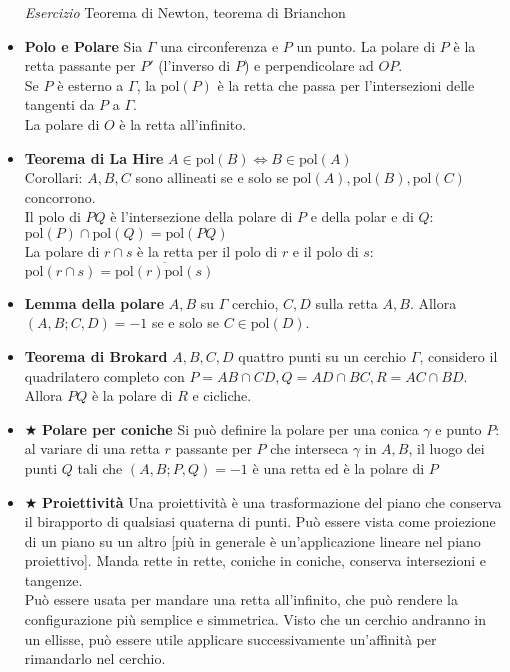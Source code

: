 \begin{itemize}
\emph{Esercizio} Teorema di Newton, teorema di Brianchon

\item \textbf{Polo e Polare}
Sia $\Gamma$ una circonferenza e $P$ un punto. La polare di $P$ è la retta passante per $P'$ (l'inverso di $P$) e perpendicolare ad $OP$. \\
Se $P$ è esterno a $\Gamma$, la $\text{pol}(P)$ è la retta che passa per l'intersezioni delle tangenti da $P$ a $\Gamma$. \\
La polare di $O$ è la retta all'infinito.

\item\textbf{Teorema di La Hire} $A \in \text{pol}(B) \iff B \in \text{pol}(A)$\\
Corollari: $A,B,C$ sono allineati se e solo se $\text{pol}(A), \text{pol}(B), \text{pol}(C)$ concorrono.\\
Il polo di $PQ$ è l'intersezione della polare di $P$ e della polar e di $Q$: $\text{pol}(P)\cap \text{pol}(Q)= \text{pol}(PQ)$\\
La polare di $r\cap s$ è la retta per il polo di $r$ e il polo di $s$:  $\text{pol}(r\cap s)= \overline{\text{pol}(r)\text{pol}(s)}$\\

\item \textbf{Lemma della polare}
$A,B$ su $\Gamma$ cerchio, $C,D$ sulla retta $A,B$. Allora $(A,B;C,D)=-1$ se e solo se $C \in \text{pol}(D)$.

\item \textbf{Teorema di Brokard}
$A,B,C,D$ quattro punti su un cerchio $\Gamma$, considero il quadrilatero completo con $P=AB\cap CD, Q=AD\cap BC, R=AC\cap BD$. Allora $PQ$ è la polare di $R$ e cicliche.

\item $\bigstar$ \textbf{Polare per coniche} 
Si può definire la polare per una conica $\gamma$ e punto $P$: al variare di una retta $r$ passante per $P$ che interseca $\gamma$ in $A,B$, il luogo dei punti $Q$ tali che $(A,B;P,Q)=-1$ è una retta ed è la polare di $P$

\item $\bigstar$ \textbf{Proiettività} Una proiettività è una trasformazione del piano che conserva il birapporto di qualsiasi quaterna di punti. Può essere vista come proiezione di un piano su un altro [più in generale è un'applicazione lineare nel piano proiettivo]. Manda rette in rette, coniche in coniche, conserva intersezioni e tangenze.\\
Può essere usata per mandare una retta all'infinito, che può rendere la configurazione più semplice e simmetrica. Visto che un cerchio andranno in un ellisse, può essere utile applicare successivamente un'affinità per rimandarlo nel cerchio.





\end{itemize}



